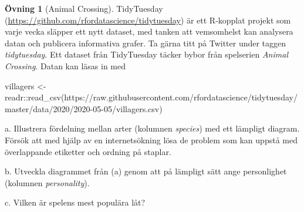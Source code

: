 \documentclass[
]{book}
\newenvironment{Shaded}{\begin{snugshade}}{\end{snugshade}}
\newcommand{\FunctionTok}[1]{\textcolor[rgb]{0.00,0.00,0.00}{#1}}
\newcommand{\NormalTok}[1]{#1}
\newcommand{\OtherTok}[1]{\textcolor[rgb]{0.56,0.35,0.01}{#1}}
\newcommand{\SpecialCharTok}[1]{\textcolor[rgb]{0.00,0.00,0.00}{#1}}
\newcommand{\StringTok}[1]{\textcolor[rgb]{0.31,0.60,0.02}{#1}}
\theoremstyle{definition}
\theoremstyle{definition}
\theoremstyle{definition}
\newtheorem{exercise}{Övning}[chapter]
\theoremstyle{definition}
\theoremstyle{remark}
\begin{document}
\begin{exercise}[Animal Crossing]
TidyTuesday (\url{https://github.com/rfordatascience/tidytuesday}) är ett R-kopplat projekt som varje vecka släpper ett nytt dataset, med tanken att vemsomhelst kan analysera datan och publicera informativa grafer. Ta gärna titt på Twitter under taggen \emph{tidytuesday}. Ett dataset från TidyTuesday täcker bybor från spelserien \emph{Animal Crossing}. Datan kan läsas in med

\begin{Shaded}
\begin{Highlighting}[]
\NormalTok{villagers }\OtherTok{\textless{}{-}}\NormalTok{ readr}\SpecialCharTok{::}\FunctionTok{read\_csv}\NormalTok{(}\StringTok{\textquotesingle{}https://raw.githubusercontent.com/rfordatascience/tidytuesday/master/data/2020/2020{-}05{-}05/villagers.csv\textquotesingle{}}\NormalTok{)}
\end{Highlighting}
\end{Shaded}

a. Illustrera fördelning mellan arter (kolumnen \emph{species}) med ett lämpligt diagram. Försök att med hjälp av en internetsökning lösa de problem som kan uppstå med överlappande etiketter och ordning på staplar.

b. Utveckla diagrammet från (a) genom att på lämpligt sätt ange personlighet (kolumnen \emph{personality}).

c. Vilken är spelens mest populära låt?
\end{exercise}
\end{document}
